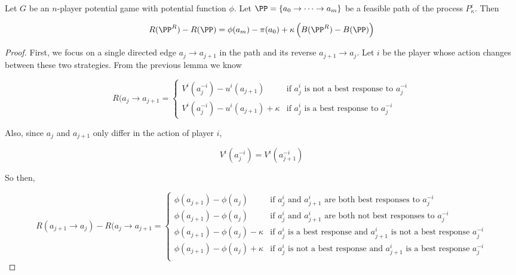 \begin{lem}
Let $G$ be an $n$-player potential game with potential function $\phi$. Let $\PP = \{a_0 \rightarrow \cdots \rightarrow a_m\}$ be a feasible path of the process $P_{\kappa}^{\epsilon}$. Then 

$$
R(\PP^R) - R(\PP) = \phi(a_m) - \pi(a_0) + \kappa \left( B(\PP^R) - B(\PP) \right)
$$
\end{lem}

\begin{proof}
First, we focus on a single directed edge $a_j \rightarrow a_{j+1}$ in the path and its reverse $a_{j+1} \rightarrow a_j$. Let $i$ be the player whose action changes between these two strategies. From the previous lemma we know

\begin{equation}
    R(a_j \rightarrow a_{j+1} = 
     \begin{cases} 
      V^i(a_j^{-i}) - u^i(a_{j+1})  & \text{if } a_j^{i} \text{ is not a best response to } a_j^{-i} \\
      V^i(a_j^{-i}) - u^i(a_{j+1}) + \kappa & \text{if } a_j^{i} \text{ is a best response to } a_j^{-i}
   \end{cases}
\end{equation}

Also, since $a_j$ and $a_{j+1}$ only differ in the action of player $i$, 

$$
V^i(a_j^{-i}) = V^i(a_{j+1}^{-i})
$$

So then,

\begin{equation}
    R(a_{j+1} \rightarrow a_j) - R(a_j \rightarrow a_{j+1} = 
     \begin{cases} 
      \phi(a_{j+1}) - \phi(a_j)  & \text{if } a_j^{i} \text{ and } a_{j+1}^i \text{ are both best responses to } a_j^{-i} \\
      \phi(a_{j+1}) - \phi(a_j)  & \text{if } a_j^{i} \text{ and } a_{j+1}^i \text{ are both not best responses to } a_j^{-i} \\
      \phi(a_{j+1}) - \phi(a_j) - \kappa  & \text{if } a_j^{i} \text{ is a best response and } a_{j+1}^i \text{ is not a best response } a_j^{-i} \\
      \phi(a_{j+1}) - \phi(a_j) + \kappa  & \text{if } a_j^{i} \text{ is not a best response and } a_{j+1}^i \text{ is a best response } a_j^{-i} \\
   \end{cases}
\end{equation}


\end{proof}
